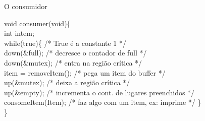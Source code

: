 \documentclass[11pt]{beamer}
\begin{document}
\begin{frame}{ O consumidor}
  \begin{algorithm}[H]
    
    void consumer(void)\{ \\
\hspace{0,2 cm}      int intem; \\
\vspace{0,3 cm}      
\hspace{0,2 cm}      while(true)\{		/* True é a constante 1 */\\
\hspace{0,5 cm}	down(\&full);		/* decresce o contador de full */\\
\hspace{0,5 cm}	down(\&mutex);		/* entra na região crítica */\\
\hspace{0,5 cm}	item = removeItem(); 	/* pega um item do buffer */\\
\hspace{0,5 cm}	up(\&mutex);	 	/* deixa a região crítica */\\
\hspace{0,5 cm}	up(\&empty);		/* incrementa o cont. de lugares preenchidos */\\
\hspace{0,5 cm}	consomeItem(Item);	/* faz algo com um item, ex: imprime */
\hspace{0,2 cm}      \}\\
    \}\\
  \end{algorithm}

\end{frame}



\end{document}
